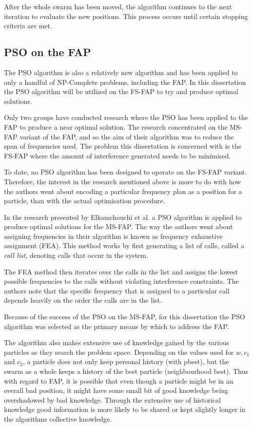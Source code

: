 After the whole swarm has been moved, the algorithm continues to the next iteration to evaluate the new positions. This process occurs until certain stopping criteria are met.


\subsection{PSO on the FAP}
\label{sec:psoonfap}
The PSO algorithm is also a relatively new algorithm and has been applied to only a handful of NP-Complete problems, including the FAP. In this dissertation the PSO algorithm will be utilized on the FS-FAP to try and produce optimal solutions. 

Only two groups have conducted research where the PSO has been applied to the FAP to produce a near optimal solution. The research concentrated on the MS-FAP variant of the FAP, and so the aim of their algorithm was to reduce the span of frequencies used. The problem this dissertation is concerned with is the FS-FAP where the amount of interference generated needs to be minimised. 

To date, no PSO algorithm has been designed to operate on the FS-FAP variant. Therefore, the interest in the research mentioned above is more to do with how the authors went about encoding a particular frequency plan as a position for a particle, than with the actual optimisation procedure.

In the research presented by Elkamchouchi et al.\cite{EgyptFAPPSO} a PSO algorithm is applied to produce optimal solutions for the MS-FAP. The way the authors went about assigning frequencies in their algorithm is known as frequency exhaustive assignment (FEA).
This method works by first generating a list of calls, called a \emph{call list}, denoting calls that occur in the system\cite{EgyptFAPPSO}. 

The FEA method then iterates over the calls in the list and assigns the lowest possible frequencies to the calls without violating interference constraints\cite{EgyptFAPPSO}. The authors note that the specific frequency that is assigned to a particular call depends heavily on the order the calls are in the list\cite{EgyptFAPPSO}.

Because of the success of the PSO on the MS-FAP, for this dissertation the PSO algorithm was selected as the primary means by which to address the FAP.

The algorithm also makes extensive use of knowledge gained by the various particles as they search the problem space. Depending on the values used for $w, c_1$ and $c_2$, a particle does not only keep personal history (with pbest), but the swarm as a whole keeps a history of the best particle (neighbourhood best). Thus with regard to FAP, it is possible that even though a particle might be in an overall bad position, it might have some small bit of good knowledge being overshadowed by bad knowledge. Through the extensive use of historical knowledge good information is more likely to be shared or kept slightly longer in the algorithms collective knowledge.

